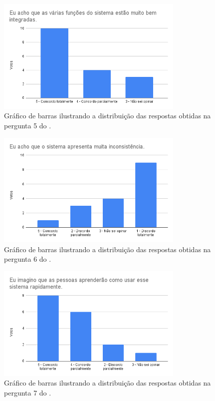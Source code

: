 \documentclass[12pt]{tcc}
\begin{document}
	\begin{figure}[!ht]
		\centering
		\includegraphics[width=0.8\textwidth]{figures/respostas-pergunta-5.png}
		\caption{Gráfico de barras ilustrando a distribuição das respostas obtidas na pergunta 5 do .}
		\label{fig:respostas-pergunta-5}
	\end{figure}

	\begin{figure}[!ht]
		\centering
		\includegraphics[width=0.8\textwidth]{figures/respostas-pergunta-6.png}
		\caption{Gráfico de barras ilustrando a distribuição das respostas obtidas na pergunta 6 do .}
		\label{fig:respostas-pergunta-6}
	\end{figure}

	\begin{figure}[!ht]
		\centering
		\includegraphics[width=0.8\textwidth]{figures/respostas-pergunta-7.png}
		\caption{Gráfico de barras ilustrando a distribuição das respostas obtidas na pergunta 7 do .}
		\label{fig:respostas-pergunta-7}
	\end{figure}
\end{document}
